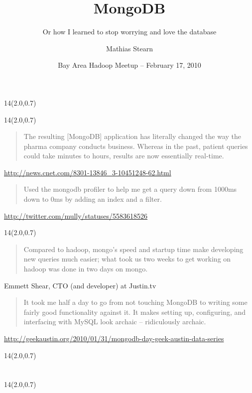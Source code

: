 \documentclass{beamer}
\title{MongoDB}
\subtitle{Or how I learned to stop worrying and love the database}
\author{Mathias Stearn}
\institute{10gen}
\date{Bay Area Hadoop Meetup -- February 17, 2010}
\newcommand{\MongoLogo}{
\begin{textblock}{14}(2.0,0.7)
  \pgfuseimage{logo}
\end{textblock}
}
\begin{document}
\begin{frame}
  \MongoLogo
  \titlepage
\end{frame}

\begin{frame}
  \MongoLogo

  \begin{quote}
    The resulting [MongoDB] application has literally changed the way the
    pharma company conducts business. Whereas in the past, patient queries
    could take minutes to hours, results are now essentially real-time.
  \end{quote}
  \small \url{http://news.cnet.com/8301-13846_3-10451248-62.html}

  \begin{quote}
    Used the mongodb profiler to help me get a query down from 1000ms down to
    0ms by adding an index and a filter.
  \end{quote}
  \small \url{http://twitter.com/mully/statuses/5583618526}
\end{frame}

\begin{frame}
  \MongoLogo

  \begin{quote}
    Compared to hadoop, mongo's speed and startup time make developing new
    queries much easier; what took us two weeks to get working on hadoop was
    done in two days on mongo.
  \end{quote}
  \small Emmett Shear, CTO (and developer) at Justin.tv

  \begin{quote}
    It took me half a day to go from not touching MongoDB to writing some
    fairly good functionality against it. It makes setting up, configuring, and
    interfacing with MySQL look archaic -- ridiculously archaic.
  \end{quote}
  \small \url{http://geekaustin.org/2010/01/31/mongodb-day-geek-austin-data-series}
\end{frame}

\begin{frame}
  \MongoLogo
  \center
\end{frame}

\section[Outline]{}
\begin{frame}
  \MongoLogo
  \tableofcontents
\end{frame}
\end{document}

